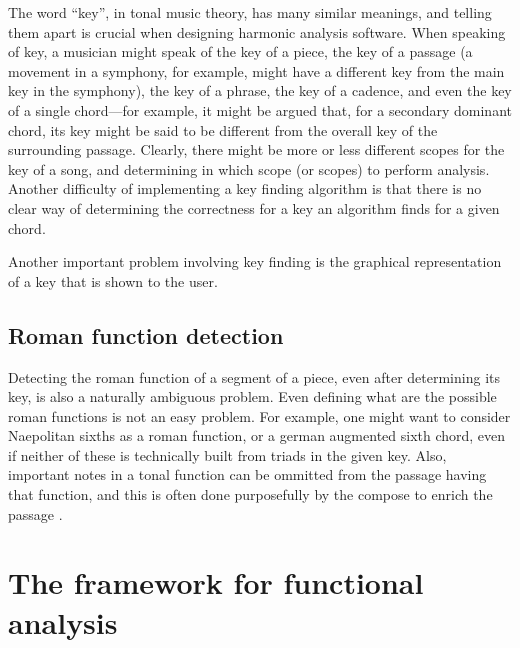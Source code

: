 The word ``key'', in tonal music theory, has many similar meanings,
and telling them apart is crucial when designing harmonic analysis
software. When speaking of key, a musician might speak of the key of a
piece, the key of a passage (a movement in a symphony, for example,
might have a different key from the main key in the symphony), the key
of a phrase, the key of a cadence, and even the key of a single
chord---for example, it might be argued that, for a secondary dominant
chord, its key might be said to be different from the overall key of
the surrounding passage. Clearly, there might be more or less
different scopes for the key of a song, and determining in which scope
(or scopes) to perform analysis. Another difficulty of implementing a
key finding algorithm is that there is no clear way of determining the
correctness for a key an algorithm finds for a given chord.

Another important problem involving key finding is the graphical
representation of a key that is shown to the user.

\subsection{Roman function detection}
\label{sec:roman-funct-detect}

Detecting the roman function of a segment of a piece, even after
determining its key, is also a naturally ambiguous problem. Even
defining what are the possible roman functions is not an easy problem.
For example, one might want to consider Naepolitan sixths as a roman
function, or a german augmented sixth chord, even if neither of these
is technically built from triads in the given key. Also, important
notes in a tonal function can be ommitted from the passage having that
function, and this is often done purposefully by the compose to enrich
the passage \cite{schoenberg83:theory}.


\section{The framework for functional analysis}
\label{sec:framework}

